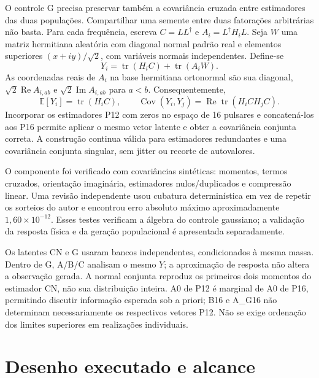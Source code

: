 O controle G precisa preservar também a covariância cruzada entre estimadores das duas populações. Compartilhar uma semente entre duas fatorações arbitrárias não basta. Para cada frequência, escreva $C=LL^\dagger$ e $A_i=L^\dagger H_iL$. Seja $W$ uma matriz hermitiana aleatória com diagonal normal padrão real e elementos superiores $(x+iy)/\sqrt2$, com variáveis normais independentes. Define-se
\begin{equation}
 Y_i=\operatorname{tr}(H_iC)+\operatorname{tr}(A_iW).
\end{equation}
As coordenadas reais de $A_i$ na base hermitiana ortonormal são sua diagonal, $\sqrt2\operatorname{Re}A_{i,ab}$ e $\sqrt2\operatorname{Im}A_{i,ab}$ para $a<b$. Consequentemente,
\begin{equation}
 \mathbb E[Y_i]=\operatorname{tr}(H_iC),\qquad
 \operatorname{Cov}(Y_i,Y_j)=\operatorname{Re}\operatorname{tr}(H_iCH_jC).
\end{equation}
Incorporar os estimadores P12 com zeros no espaço de 16 pulsares e concatená-los aos P16 permite aplicar o mesmo vetor latente e obter a covariância conjunta correta. A construção continua válida para estimadores redundantes e uma covariância conjunta singular, sem jitter ou recorte de autovalores.

O componente foi verificado com covariâncias sintéticas: momentos, termos cruzados, orientação imaginária, estimadores nulos/duplicados e compressão linear. Uma revisão independente usou cubatura determinística em vez de repetir os sorteios do autor e encontrou erro absoluto máximo aproximadamente $1{,}60\times10^{-12}$. Esses testes verificam a álgebra do controle gaussiano; a validação da resposta física e da geração populacional é apresentada separadamente.

Os latentes CN e G usaram bancos independentes, condicionados à mesma massa. Dentro de G, A/B/C analisam o mesmo $Y$; a aproximação de resposta não altera a observação gerada. A normal conjunta reproduz os primeiros dois momentos do estimador CN, não sua distribuição inteira. A0 de P12 é marginal de A0 de P16, permitindo discutir informação esperada sob a priori; B16 e A\_G16 não determinam necessariamente os respectivos vetores P12. Não se exige ordenação dos limites superiores em realizações individuais.

\section{Desenho executado e alcance}

